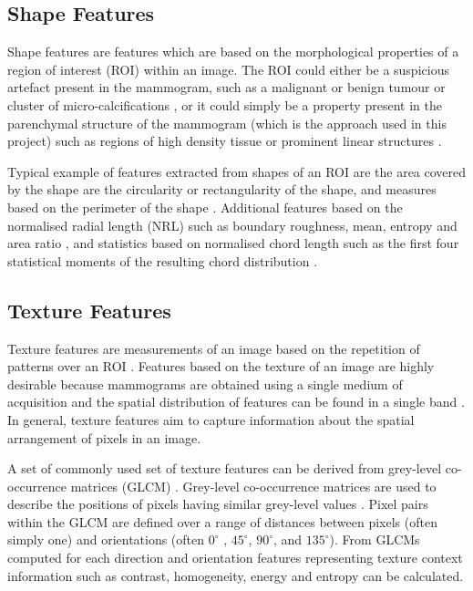 \subsection{Shape Features}
Shape features are features which are based on the morphological properties of a region of interest (ROI) within an image. The ROI could either be a suspicious artefact present in the mammogram, such as a malignant or benign tumour or cluster of micro-calcifications \cite{cheng2006approaches}, or it could simply be a property present in the parenchymal structure of the mammogram (which is the approach used in this project) such as regions of high density tissue \cite{chen2013multiscale} or prominent linear structures \cite{zwiggelaar1996finding}.

Typical example of features extracted from shapes of an ROI are the area covered by the shape are the circularity or rectangularity of the shape, and measures based on the perimeter of the shape \cite{petrick1999combined}. Additional features based on the normalised radial length (NRL) \cite{kilday1993classifying} such as boundary roughness, mean, entropy and area ratio \cite{petrick1999combined, petrick1996automated}, and statistics based on normalised chord length \cite{you1984performance} such as the first four statistical  moments of the resulting chord distribution \cite{el1996shape}.

\subsection{Texture Features}
Texture features are measurements of an image based on the repetition of patterns over an ROI \cite{parker2010algorithms}. Features based on the texture of an image are highly desirable because mammograms are obtained using a single medium of acquisition and the spatial distribution of features can be found in a single band \cite{ganesan2013computer}. In general, texture features aim to capture information about the spatial arrangement of pixels in an image.

A set of commonly used set of texture features can be derived from grey-level co-occurrence matrices (GLCM) \cite{haralick1973textural}. Grey-level co-occurrence matrices are used to describe the positions of pixels having similar grey-level values \cite{parker2010algorithms}. Pixel pairs within the GLCM are defined over a range of distances between pixels (often simply one) and orientations (often $0^\circ$ , $45^\circ$, $90^\circ$, and $135^\circ$). From GLCMs computed for each direction and orientation features representing texture context information such as  contrast, homogeneity, energy and entropy \cite{haralick1973textural, cheng2006approaches, parker2010algorithms} can be calculated.

